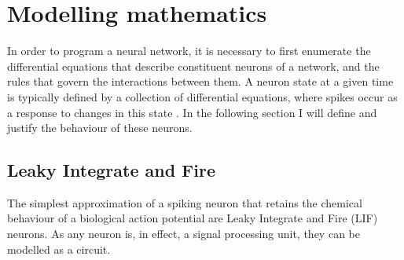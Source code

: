 \section{Modelling mathematics}

In order to program a neural network, it is necessary to first enumerate the
differential equations that describe constituent neurons of a network, and the
rules that govern the interactions between them. A neuron state at a given time
is typically defined by a collection of differential equations, where spikes
occur as a response to changes in this state \autocite{brette_simulation_2007}.
In the following section I will define and justify the behaviour of these
neurons.

\subsection{Leaky Integrate and Fire}

The simplest approximation of a spiking neuron that retains the chemical
behaviour of a biological action potential are Leaky Integrate and Fire (LIF)
neurons. As any neuron is, in effect, a signal processing unit, they can be
modelled as a circuit.

